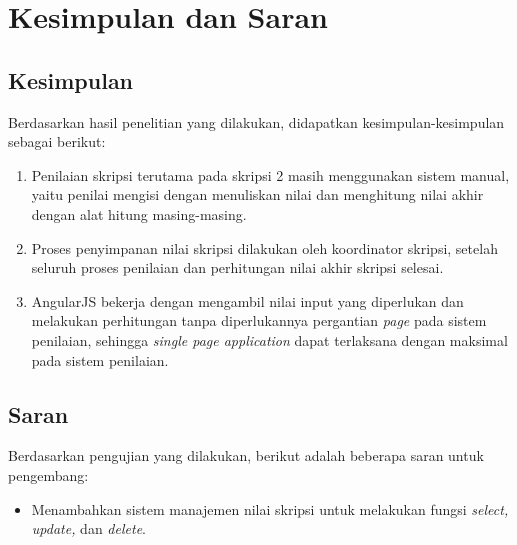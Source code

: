 \chapter{Kesimpulan dan Saran}
\label{chap: kesimpulan}

\section{Kesimpulan}
\label{sec: kesimpulan}
	
	Berdasarkan hasil penelitian yang dilakukan, didapatkan kesimpulan-kesimpulan sebagai berikut:
	\begin{enumerate}
		\item Penilaian skripsi terutama pada skripsi 2 masih menggunakan sistem manual, yaitu penilai mengisi dengan menuliskan nilai dan menghitung nilai akhir dengan alat hitung masing-masing.
		\item Proses penyimpanan nilai skripsi dilakukan oleh koordinator skripsi, setelah seluruh proses penilaian dan perhitungan nilai akhir skripsi selesai.
		\item AngularJS bekerja dengan mengambil nilai input yang diperlukan dan melakukan perhitungan tanpa diperlukannya pergantian \textit{page} pada sistem penilaian, sehingga \textit{single page application} dapat terlaksana dengan maksimal pada sistem penilaian.
	\end{enumerate}

\section{Saran}
\label{sec: saran}

	Berdasarkan pengujian yang dilakukan, berikut adalah beberapa saran untuk pengembang:
	\begin{itemize}
		\item Menambahkan sistem manajemen nilai skripsi untuk melakukan fungsi \textit{select, update,} dan \textit{delete}.
	\end{itemize}
	